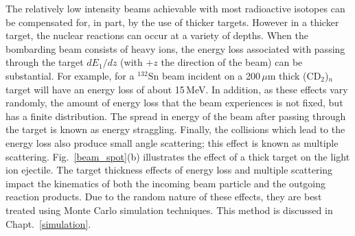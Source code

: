 The relatively low intensity beams achievable with most radioactive isotopes can be compensated for, in part, by the use of thicker targets.  However in a thicker target, the nuclear reactions can occur at a variety of depths.  When the bombarding beam consists of heavy ions, the energy loss associated with passing through the target $dE_1/dz$ (with $+z$ the direction of the beam) can be substantial.  For example, for a $^{132}$Sn beam incident on a 200\,$\mu$m thick (CD$_2$)$_{n}$ target will have an energy loss of about 15\,MeV.  In addition, as these effects vary randomly, the amount of energy loss that the beam experiences is not fixed, but has a finite distribution.  The spread in energy of the beam after passing through the target is known as energy straggling.  Finally, the collisions which lead to the energy loss also produce small angle scattering; this effect is known as multiple scattering.  Fig.~\ref{beam_spot}(b) illustrates the effect of a thick target on the light ion ejectile.  The target thickness effects of energy loss and multiple scattering impact the kinematics of both the incoming beam particle and the outgoing reaction products.  Due to the random nature of these effects, they are best treated using Monte Carlo simulation techniques.  This method is discussed in Chapt.~\ref{simulation}.  


